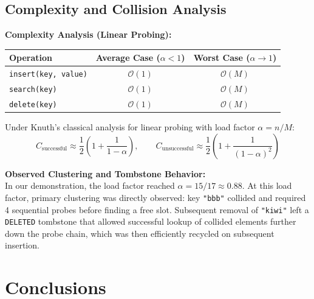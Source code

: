 \documentclass[12pt,a4paper]{article}
\theoremstyle{plain}
\theoremstyle{definition}
\theoremstyle{remark}
\begin{document}
\subsection{Complexity and Collision Analysis}
\begin{infobox}
  \textbf{\color{primary}Complexity Analysis (Linear Probing):}
  \vspace{0.4em}
  \begin{center}
  \begin{tabular}{lcc}
    \toprule
    \textbf{Operation} & \textbf{Average Case ($\alpha < 1$)} & \textbf{Worst Case ($\alpha \to 1$)} \\
    \midrule
    \texttt{insert(key, value)} & $\mathcal{O}(1)$ & $\mathcal{O}(M)$ \\
    \texttt{search(key)}        & $\mathcal{O}(1)$ & $\mathcal{O}(M)$ \\
    \texttt{delete(key)}        & $\mathcal{O}(1)$ & $\mathcal{O}(M)$ \\
    \bottomrule
  \end{tabular}
  \end{center}
  \vspace{0.4em}
  Under Knuth's classical analysis for linear probing with load factor $\alpha = n/M$:
  \[
    C_{\text{successful}} \approx \frac{1}{2}\left(1 + \frac{1}{1-\alpha}\right), \qquad
    C_{\text{unsuccessful}} \approx \frac{1}{2}\left(1 + \frac{1}{(1-\alpha)^2}\right)
  \]
\end{infobox}

\begin{keybox}
  \textbf{\color{warningborder!80!black}Observed Clustering and Tombstone Behavior:} \\
  In our demonstration, the load factor reached $\alpha = 15/17 \approx 0.88$. At this load factor, primary clustering was directly observed: key \texttt{"bbb"} collided and required 4 sequential probes before finding a free slot. Subsequent removal of \texttt{"kiwi"} left a \texttt{DELETED} tombstone that allowed successful lookup of collided elements further down the probe chain, which was then efficiently recycled on subsequent insertion.
\end{keybox}

\newpage
\section{Conclusions}
\end{document}
